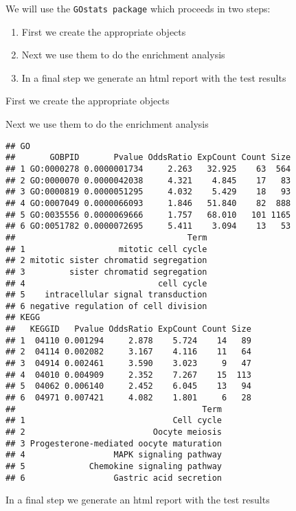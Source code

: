 \documentclass{article}\usepackage[]{graphicx}\usepackage[]{color}
\makeatletter
\newenvironment{kframe}{%
 \def\at@end@of@kframe{}%
 \ifinner\ifhmode%
  \def\at@end@of@kframe{\end{minipage}}%
  \begin{minipage}{\columnwidth}%
 \fi\fi%
 \def\FrameCommand##1{\hskip\@totalleftmargin \hskip-\fboxsep
 \colorbox{shadecolor}{##1}\hskip-\fboxsep
     \hskip-\linewidth \hskip-\@totalleftmargin \hskip\columnwidth}%
 \MakeFramed {\advance\hsize-\width
   \@totalleftmargin\z@ \linewidth\hsize
   \@setminipage}}%
 {\par\unskip\endMakeFramed%
 \at@end@of@kframe}
\newenvironment{knitrout}{}{} %
\makeatother
\begin{document}
We will use the \texttt{GOstats package} which proceeds in two steps:
\begin{enumerate}
  \item First we create the appropriate objects
  \item Next we use them to do the enrichment analysis
  \item In a final step we generate an html report with the test results
\end{enumerate}

First we create the appropriate objects


Next we use them to do the enrichment analysis
\begin{knitrout}
\color{fgcolor}\begin{kframe}
\begin{verbatim}
## GO
##       GOBPID       Pvalue OddsRatio ExpCount Count Size
## 1 GO:0000278 0.0000001734     2.263   32.925    63  564
## 2 GO:0000070 0.0000042038     4.321    4.845    17   83
## 3 GO:0000819 0.0000051295     4.032    5.429    18   93
## 4 GO:0007049 0.0000066093     1.846   51.840    82  888
## 5 GO:0035556 0.0000069666     1.757   68.010   101 1165
## 6 GO:0051782 0.0000072695     5.411    3.094    13   53
##                                   Term
## 1                   mitotic cell cycle
## 2 mitotic sister chromatid segregation
## 3         sister chromatid segregation
## 4                           cell cycle
## 5    intracellular signal transduction
## 6 negative regulation of cell division
## KEGG
##   KEGGID   Pvalue OddsRatio ExpCount Count Size
## 1  04110 0.001294     2.878    5.724    14   89
## 2  04114 0.002082     3.167    4.116    11   64
## 3  04914 0.002461     3.590    3.023     9   47
## 4  04010 0.004909     2.352    7.267    15  113
## 5  04062 0.006140     2.452    6.045    13   94
## 6  04971 0.007421     4.082    1.801     6   28
##                                      Term
## 1                              Cell cycle
## 2                          Oocyte meiosis
## 3 Progesterone-mediated oocyte maturation
## 4                  MAPK signaling pathway
## 5             Chemokine signaling pathway
## 6                  Gastric acid secretion
\end{verbatim}
\end{kframe}
\end{knitrout}

In a final step we generate an html report with the test results
\end{document}
